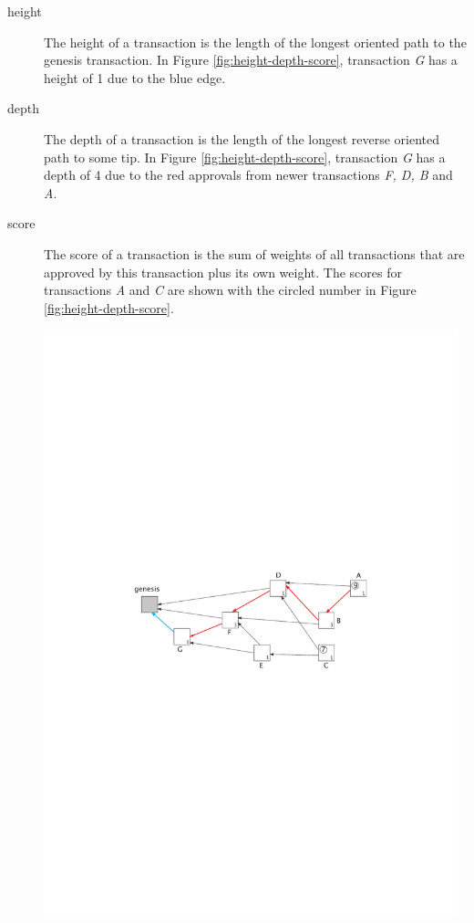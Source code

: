 \begin{description}
\begin{minipage}{\linewidth}
            \label{fig:cumulative-weight}
        \end{minipage}
    \item[height] The height of a transaction is the length of the longest oriented path to the genesis transaction. In Figure \ref{fig:height-depth-score}, transaction \textit{G} has a height of 1 due to the blue edge.
    \item[depth] The depth of a transaction is the length of the longest reverse oriented path to some tip. In Figure \ref{fig:height-depth-score}, transaction \textit{G} has a depth of 4 due to the red approvals from newer transactions \textit{F, D, B} and \textit{A}.
    \item[score] The score of a transaction is the sum of weights of all transactions that are approved by this transaction plus its own weight. The scores for transactions \textit{A} and \textit{C} are shown with the circled number in Figure \ref{fig:height-depth-score}.\par
        \begin{minipage}{\linewidth}
            \centering
            \includegraphics[width=12cm]{images/height-depth-score.pdf}
            \label{fig:height-depth-score}
        \end{minipage}
\end{description}

